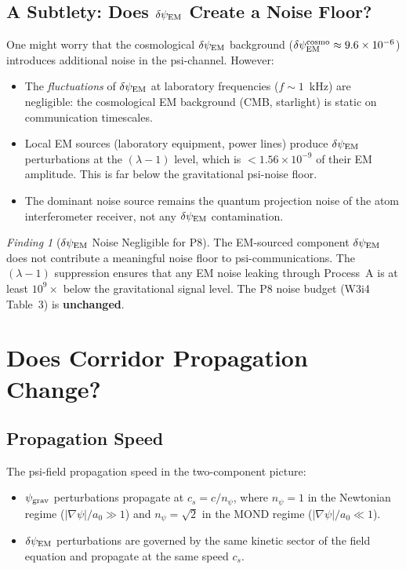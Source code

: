 \documentclass[11pt]{article}
\theoremstyle{definition}
\theoremstyle{remark}
\newtheorem{finding}[theorem]{Finding}
\newcommand{\ee}[1]{\times 10^{#1}}
\newcommand{\psigrav}{\psi_{\rm grav}}
\newcommand{\dpsiEM}{\delta\psi_{\rm EM}}
\newcommand{\lam}{\lambda}
\begin{document}
\subsection{A Subtlety: Does $\dpsiEM$ Create a Noise Floor?}

One might worry that the cosmological $\dpsiEM$ background
($\dpsiEM^{\rm cosmo} \approx 9.6\ee{-6}$) introduces additional noise
in the psi-channel. However:
\begin{itemize}[nosep]
\item The \emph{fluctuations} of $\dpsiEM$ at laboratory frequencies
  ($f \sim 1$~kHz) are negligible: the cosmological EM background (CMB,
  starlight) is static on communication timescales.
\item Local EM sources (laboratory equipment, power lines) produce
  $\dpsiEM$ perturbations at the $(\lam-1)$ level, which is
  $< 1.56\ee{-9}$ of their EM amplitude. This is far below the
  gravitational psi-noise floor.
\item The dominant noise source remains the quantum projection noise of
  the atom interferometer receiver, not any $\dpsiEM$ contamination.
\end{itemize}

\begin{finding}[$\dpsiEM$ Noise Negligible for P8]
\label{find:dpsiEM_noise}
The EM-sourced component $\dpsiEM$ does not contribute a meaningful noise
floor to psi-communications. The $(\lam-1)$ suppression ensures that any
EM noise leaking through Process~A is at least $10^{9}\times$ below the
gravitational signal level. The P8 noise budget (W3i4 Table~3) is
\textbf{unchanged}.
\end{finding}

\section{Does Corridor Propagation Change?}
\label{sec:corridor_propagation}

\subsection{Propagation Speed}

The psi-field propagation speed in the two-component picture:
\begin{itemize}[nosep]
\item $\psigrav$ perturbations propagate at $c_s = c/n_\psi$, where
  $n_\psi = 1$ in the Newtonian regime ($|\nabla\psi|/a_0 \gg 1$) and
  $n_\psi = \sqrt{2}$ in the MOND regime ($|\nabla\psi|/a_0 \ll 1$).
\item $\dpsiEM$ perturbations are governed by the same kinetic sector
  of the field equation and propagate at the same speed $c_s$.
\end{itemize}
\end{document}
